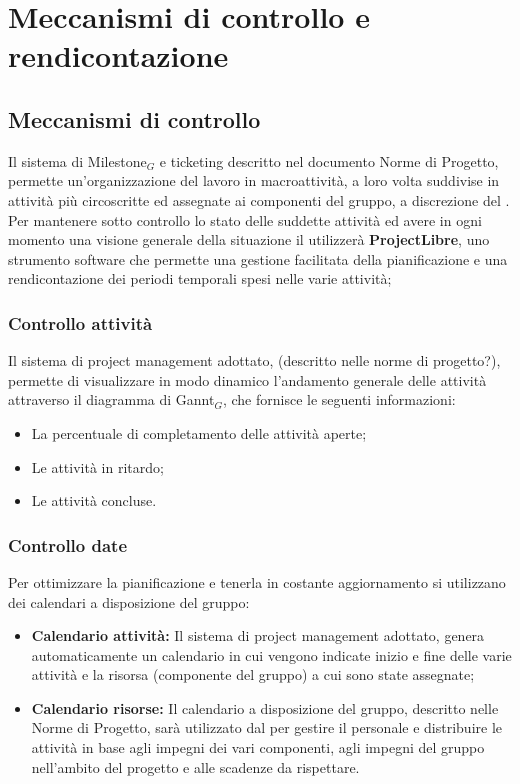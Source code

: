 
\section{Meccanismi di controllo e rendicontazione}

\subsection{Meccanismi di controllo}
Il sistema di Milestone$_G$ e ticketing descritto nel documento Norme di Progetto, permette un'organizzazione del lavoro in macroattività, a loro volta suddivise in attività più circoscritte ed assegnate ai componenti del gruppo, a discrezione del \ruoloResponsabile.
Per mantenere sotto controllo lo stato delle suddette attività ed avere in ogni momento una visione generale della situazione il \ruoloResponsabile{} utilizzerà \textbf{ProjectLibre}, uno strumento software che permette una gestione facilitata della pianificazione e una rendicontazione dei periodi temporali spesi nelle varie attività;

\subsubsection{Controllo attività}

Il sistema di project management adottato, (descritto nelle norme di progetto?), permette di visualizzare in modo dinamico l'andamento generale delle attività attraverso il diagramma di Gannt$_G$, che fornisce le seguenti informazioni:
\begin{itemize}
\item La percentuale di completamento delle attività aperte;
\item Le attività in ritardo;
\item Le attività concluse.
\end{itemize}

\subsubsection{Controllo date}
Per ottimizzare la pianificazione e tenerla in costante aggiornamento si utilizzano dei calendari a disposizione del gruppo:
\begin{itemize}
\item \textbf{Calendario attività:} Il sistema di project management adottato, genera automaticamente un calendario in cui vengono indicate inizio e fine delle varie attività e la risorsa (componente del gruppo) a cui sono state assegnate;
\item \textbf{Calendario risorse:} Il calendario a disposizione del gruppo, descritto nelle Norme di Progetto, sarà utilizzato dal \ruoloResponsabile{} per gestire il personale e distribuire le attività in base agli impegni dei vari componenti, agli impegni del gruppo nell'ambito del progetto e alle scadenze da rispettare.
\end{itemize}

